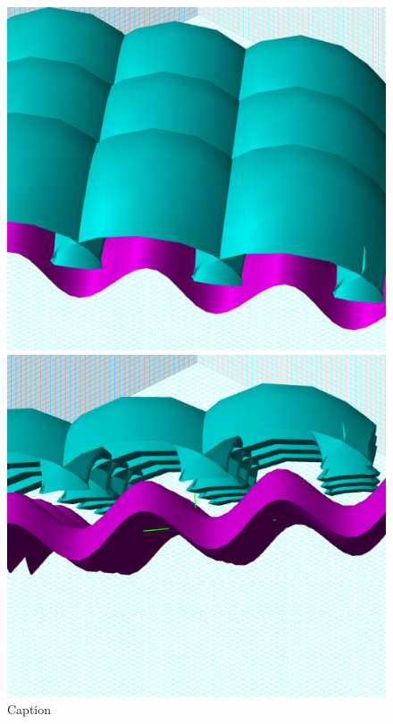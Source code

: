 \begin{figure}[H]
\begin{minipage}[b]{0.3\linewidth}
    \vspace{4ex}
  \end{minipage} %
  \begin{minipage}[b]{0.3\linewidth}
    \centering
    \includegraphics[width=.9\linewidth]{surfaces-img/Fig 41.png} 
    \caption{Caption} 
    \label{fig:fig41}
    \vspace{4ex}
  \end{minipage} %
  \begin{minipage}[b]{0.3\linewidth}
    \centering
    \includegraphics[width=.9\linewidth]{surfaces-img/Fig 42.png} 

\end{minipage}
\end{figure}

